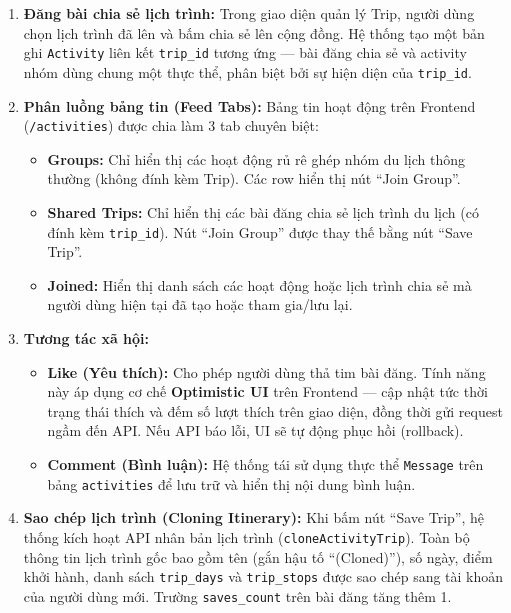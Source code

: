 \documentclass[12pt,a4paper]{article}
\begin{document}
\begin{enumerate}
  \item \textbf{Đăng bài chia sẻ lịch trình:} Trong giao diện quản lý Trip,
        người dùng chọn lịch trình đã lên và bấm chia sẻ lên cộng đồng. Hệ
        thống tạo một bản ghi \texttt{Activity} liên kết \texttt{trip\_id}
        tương ứng --- bài đăng chia sẻ và activity nhóm dùng chung một thực
        thể, phân biệt bởi sự hiện diện của \texttt{trip\_id}.
  \item \textbf{Phân luồng bảng tin (Feed Tabs):} Bảng tin hoạt động trên
        Frontend (\texttt{/activities}) được chia làm 3 tab chuyên biệt:
        \begin{itemize}
          \item \textbf{Groups:} Chỉ hiển thị các hoạt động rủ rê ghép nhóm
                du lịch thông thường (không đính kèm Trip). Các row hiển thị
                nút ``Join Group''.
          \item \textbf{Shared Trips:} Chỉ hiển thị các bài đăng chia sẻ
                lịch trình du lịch (có đính kèm \texttt{trip\_id}). Nút
                ``Join Group'' được thay thế bằng nút ``Save Trip''.
          \item \textbf{Joined:} Hiển thị danh sách các hoạt động hoặc lịch
                trình chia sẻ mà người dùng hiện tại đã tạo hoặc tham
                gia/lưu lại.
        \end{itemize}
  \item \textbf{Tương tác xã hội:}
        \begin{itemize}
          \item \textbf{Like (Yêu thích):} Cho phép người dùng thả tim bài
                đăng. Tính năng này áp dụng cơ chế \textbf{Optimistic UI}
                trên Frontend --- cập nhật tức thời trạng thái thích và đếm
                số lượt thích trên giao diện, đồng thời gửi request ngầm đến
                API. Nếu API báo lỗi, UI sẽ tự động phục hồi (rollback).
          \item \textbf{Comment (Bình luận):} Hệ thống tái sử dụng thực thể
                \texttt{Message} trên bảng \texttt{activities} để lưu trữ
                và hiển thị nội dung bình luận.
        \end{itemize}
  \item \textbf{Sao chép lịch trình (Cloning Itinerary):} Khi bấm nút ``Save
        Trip'', hệ thống kích hoạt API nhân bản lịch trình
        (\texttt{cloneActivityTrip}). Toàn bộ thông tin lịch trình gốc bao
        gồm tên (gắn hậu tố ``(Cloned)''), số ngày, điểm khởi hành, danh
        sách \texttt{trip\_days} và \texttt{trip\_stops} được sao chép sang
        tài khoản của người dùng mới. Trường \texttt{saves\_count} trên bài
        đăng tăng thêm 1.
\end{enumerate}
\end{document}
